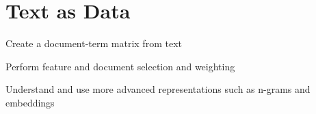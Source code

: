 \chapter{Text as Data}
\label{chap:dtm}

\begin{abstract}{Abstract}
  This chapter shows how you can analyze texts that are stored as a data frame column or variable using functions from the package  in R and the package  in Python in Python and R.
  Please see  for more information on reading and cleaning text and see  for information on installing these packages.
\end{abstract}


\begin{objectives}
\item Create a document-term matrix from text
\item Perform feature and document selection and weighting
\item Understand and use more advanced representations such as n-grams and embeddings
\end{objectives}




